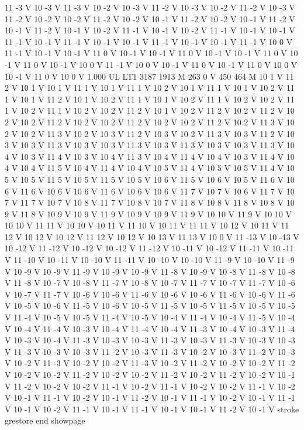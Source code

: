 {11 -3 V
10 -3 V
11 -3 V
10 -2 V
10 -3 V
11 -2 V
10 -3 V
10 -2 V
11 -2 V
10 -3 V
11 -2 V
10 -2 V
10 -2 V
11 -2 V
10 -2 V
10 -1 V
11 -2 V
10 -2 V
10 -1 V
11 -2 V
10 -1 V
11 -2 V
10 -1 V
10 -2 V
11 -1 V
10 -1 V
10 -2 V
11 -1 V
10 -1 V
10 -1 V
11 -1 V
10 -1 V
11 -1 V
10 -1 V
10 -1 V
11 -1 V
10 -1 V
10 -1 V
11 -1 V
10 0 V
11 -1 V
10 -1 V
10 -1 V
11 0 V
10 -1 V
10 -1 V
11 0 V
10 -1 V
10 -1 V
11 0 V
10 -1 V
11 0 V
10 -1 V
10 0 V
11 -1 V
10 0 V
10 -1 V
11 0 V
10 -1 V
11 0 V
10 0 V
10 -1 V
11 0 V
10 0 V
1.000 UL
LT1
3187 1913 M
263 0 V
450 464 M
10 1 V
11 2 V
10 1 V
10 1 V
11 1 V
10 1 V
11 1 V
10 2 V
10 1 V
11 1 V
10 1 V
10 2 V
11 1 V
10 1 V
11 2 V
10 1 V
10 2 V
11 1 V
10 1 V
10 2 V
11 1 V
10 2 V
10 2 V
11 1 V
10 2 V
11 1 V
10 2 V
10 2 V
11 2 V
10 1 V
10 2 V
11 2 V
10 2 V
11 2 V
10 2 V
10 2 V
11 2 V
10 2 V
10 2 V
11 2 V
10 2 V
10 2 V
11 2 V
10 2 V
11 3 V
10 2 V
10 2 V
11 3 V
10 2 V
10 3 V
11 2 V
10 3 V
10 2 V
11 3 V
10 3 V
11 2 V
10 3 V
10 3 V
11 3 V
10 3 V
10 3 V
11 3 V
10 3 V
11 3 V
10 3 V
10 3 V
11 3 V
10 4 V
10 3 V
11 4 V
10 3 V
10 4 V
11 3 V
10 4 V
11 4 V
10 4 V
10 3 V
11 4 V
10 4 V
10 4 V
11 5 V
10 4 V
11 4 V
10 4 V
10 5 V
11 4 V
10 5 V
10 5 V
11 4 V
10 5 V
10 5 V
11 5 V
10 5 V
11 5 V
10 5 V
10 6 V
11 5 V
10 6 V
10 5 V
11 6 V
10 6 V
11 6 V
10 6 V
10 6 V
11 6 V
10 6 V
10 6 V
11 7 V
10 7 V
10 6 V
11 7 V
10 7 V
11 7 V
10 7 V
10 8 V
11 7 V
10 8 V
10 7 V
11 8 V
10 8 V
11 8 V
10 8 V
10 9 V
11 8 V
10 9 V
10 9 V
11 9 V
10 9 V
10 9 V
11 9 V
10 10 V
11 9 V
10 10 V
10 10 V
11 11 V
10 10 V
10 11 V
11 10 V
10 11 V
11 11 V
10 12 V
10 11 V
11 12 V
10 12 V
10 12 V
11 12 V
10 12 V
10 13 V
11 13 V
10 0 V
11 -13 V
10 -13 V
10 -12 V
11 -12 V
10 -12 V
10 -12 V
11 -12 V
10 -11 V
10 -12 V
11 -11 V
10 -11 V
11 -10 V
10 -11 V
10 -10 V
11 -11 V
10 -10 V
10 -10 V
11 -9 V
10 -10 V
11 -9 V
10 -9 V
10 -9 V
11 -9 V
10 -9 V
10 -9 V
11 -8 V
10 -9 V
10 -8 V
11 -8 V
10 -8 V
11 -8 V
10 -7 V
10 -8 V
11 -7 V
10 -8 V
10 -7 V
11 -7 V
10 -7 V
11 -7 V
10 -6 V
10 -7 V
11 -7 V
10 -6 V
10 -6 V
11 -6 V
10 -6 V
10 -6 V
11 -6 V
10 -6 V
11 -6 V
10 -5 V
10 -6 V
11 -5 V
10 -6 V
10 -5 V
11 -5 V
10 -5 V
11 -5 V
10 -5 V
10 -5 V
11 -4 V
10 -5 V
10 -5 V
11 -4 V
10 -5 V
10 -4 V
11 -4 V
10 -4 V
11 -5 V
10 -4 V
10 -4 V
11 -4 V
10 -3 V
10 -4 V
11 -4 V
10 -4 V
11 -3 V
10 -4 V
10 -3 V
11 -4 V
10 -3 V
10 -4 V
11 -3 V
10 -3 V
10 -3 V
11 -3 V
10 -3 V
11 -3 V
10 -3 V
10 -3 V
11 -3 V
10 -3 V
10 -3 V
11 -2 V
10 -3 V
11 -3 V
10 -2 V
10 -3 V
11 -2 V
10 -3 V
10 -2 V
11 -3 V
10 -2 V
10 -2 V
11 -3 V
10 -2 V
11 -2 V
10 -2 V
10 -2 V
11 -2 V
10 -2 V
10 -2 V
11 -2 V
10 -2 V
10 -2 V
11 -2 V
10 -2 V
11 -2 V
10 -2 V
10 -1 V
11 -2 V
10 -2 V
10 -2 V
11 -1 V
10 -2 V
11 -1 V
10 -2 V
10 -2 V
11 -1 V
10 -2 V
10 -1 V
11 -1 V
10 -2 V
10 -1 V
11 -2 V
10 -1 V
11 -1 V
10 -2 V
10 -1 V
11 -1 V
10 -1 V
10 -2 V
11 -1 V
10 -1 V
11 -1 V
10 -1 V
10 -1 V
11 -2 V
10 -1 V
stroke
grestore
end
showpage
}
